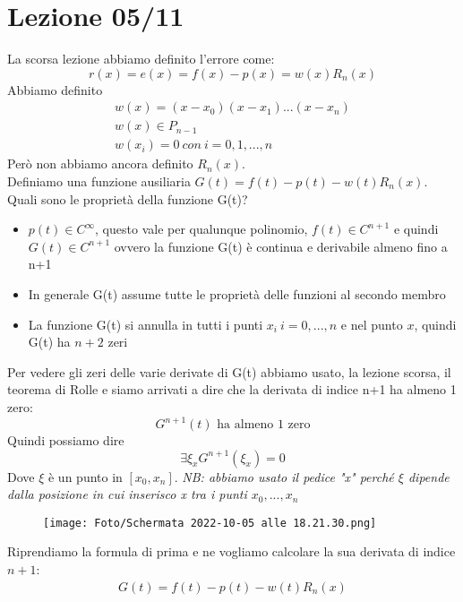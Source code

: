 \documentclass[a4paper, portrait]{book}
\numberwithin{equation}{chapter} %
\begin{document}
\chapter{Lezione 05/11}
La scorsa lezione abbiamo definito l'errore come:
\begin{equation}
    r(x) = e(x) = f(x) - p(x) = w(x) R_n(x)
\end{equation}
Abbiamo definito \begin{gather}
    w(x) = (x-x_0)(x-x_1)...(x-x_n)\\
    w(x) \in P_{n-1}\\
    w(x_i) = 0 \ con \ i = 0,1,...,n
\end{gather}
Però non abbiamo ancora definito $R_n(x)$.\\
Definiamo una funzione ausiliaria $G(t) = f(t) - p(t) - w(t)R_n(x)$.\\
Quali sono le proprietà della funzione G(t)?
\begin{itemize}
    \item $p(t) \in C^{\infty}$, questo vale per qualunque polinomio, $f(t) \in C^{n+1}$ e quindi $G(t) \in C^{n+1}$ ovvero la funzione G(t) è continua e derivabile almeno fino a n+1
    \item In generale G(t) assume tutte le proprietà delle funzioni al secondo membro
    \item La funzione G(t) si annulla in tutti i punti $x_i \ i = 0,...,n$ e nel punto $x$, quindi G(t) ha $n+2$ zeri
\end{itemize}
Per vedere gli zeri delle varie derivate di G(t) abbiamo usato, la lezione scorsa, il teorema di Rolle e siamo arrivati a dire che la derivata di indice n+1 ha almeno 1 zero:
\begin{equation}
    G^{n+1}(t) \text{ ha almeno 1 zero}
\end{equation}
Quindi possiamo dire
\begin{equation}
    \exists \xi_x G^{n+1}(\xi_x) = 0    
\end{equation}
Dove $\xi$ è un punto in $[x_0,x_n]$.
\textit{NB: abbiamo usato il pedice "x" perché $\xi$ dipende dalla posizione in cui inserisco x tra i punti $x_0,...,x_n$} 
\begin{figure}[h!]
    \centering
    \texttt{[image: Foto/Schermata 2022-10-05 alle 18.21.30.png]}
    \caption{}
\end{figure}
Riprendiamo la formula di prima e ne vogliamo calcolare la sua derivata di indice $n+1$:
\begin{gather}
    G(t) = f(t) - p(t) - w(t)R_n(x)
\end{gather}
\end{document}
